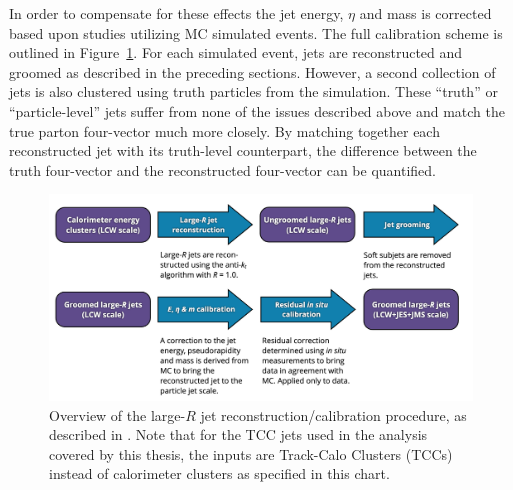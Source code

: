 In order to compensate for these effects the jet energy, $\eta$ and mass is corrected based upon studies utilizing MC simulated events.
The full calibration scheme is outlined in Figure~\ref{fig:jet_calib_flowchart}.
For each simulated event, jets are reconstructed and groomed as described in the preceding sections.
However, a second collection of jets is also clustered using truth particles from the simulation.
These ``truth'' or ``particle-level'' jets suffer from none of the issues described above and match the true parton four-vector much more closely.
By matching together each reconstructed jet with its truth-level counterpart, the difference between the truth four-vector and the reconstructed four-vector can be quantified.

\begin{figure}
	\centering
	\includegraphics[width=\textwidth]{jet_calibration_flowchart}
	\caption{
	Overview of the large-$R$ jet reconstruction/calibration procedure, as described in \cite{Aaboud:2018kfi}.
	Note that for the TCC jets used in the analysis covered by this thesis, the inputs are Track-Calo Clusters (TCCs) instead of calorimeter clusters as specified in this chart.
	}
	\label{fig:jet_calib_flowchart}
\end{figure}

